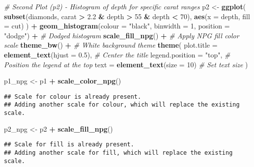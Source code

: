 \documentclass[
  12pt,
]{article}
\newenvironment{Shaded}{\begin{snugshade}}{\end{snugshade}}
\newcommand{\AttributeTok}[1]{\textcolor[rgb]{0.13,0.29,0.53}{#1}}
\newcommand{\CommentTok}[1]{\textcolor[rgb]{0.56,0.35,0.01}{\textit{#1}}}
\newcommand{\DecValTok}[1]{\textcolor[rgb]{0.00,0.00,0.81}{#1}}
\newcommand{\FloatTok}[1]{\textcolor[rgb]{0.00,0.00,0.81}{#1}}
\newcommand{\FunctionTok}[1]{\textcolor[rgb]{0.13,0.29,0.53}{\textbf{#1}}}
\newcommand{\NormalTok}[1]{#1}
\newcommand{\OtherTok}[1]{\textcolor[rgb]{0.56,0.35,0.01}{#1}}
\newcommand{\SpecialCharTok}[1]{\textcolor[rgb]{0.81,0.36,0.00}{\textbf{#1}}}
\newcommand{\StringTok}[1]{\textcolor[rgb]{0.31,0.60,0.02}{#1}}
\begin{document}
\begin{Shaded}
\begin{Highlighting}[]
\CommentTok{\# Second Plot (p2) {-} Histogram of depth for specific carat ranges}
\NormalTok{p2 }\OtherTok{\textless{}{-}} \FunctionTok{ggplot}\NormalTok{(}
  \FunctionTok{subset}\NormalTok{(diamonds, carat }\SpecialCharTok{\textgreater{}} \FloatTok{2.2} \SpecialCharTok{\&}\NormalTok{ depth }\SpecialCharTok{\textgreater{}} \DecValTok{55} \SpecialCharTok{\&}\NormalTok{ depth }\SpecialCharTok{\textless{}} \DecValTok{70}\NormalTok{),}
  \FunctionTok{aes}\NormalTok{(}\AttributeTok{x =}\NormalTok{ depth, }\AttributeTok{fill =}\NormalTok{ cut)}
\NormalTok{) }\SpecialCharTok{+}
  \FunctionTok{geom\_histogram}\NormalTok{(}\AttributeTok{colour =} \StringTok{"black"}\NormalTok{, }\AttributeTok{binwidth =} \DecValTok{1}\NormalTok{, }\AttributeTok{position =} \StringTok{"dodge"}\NormalTok{) }\SpecialCharTok{+}  \CommentTok{\# Dodged histogram}
  \FunctionTok{scale\_fill\_npg}\NormalTok{() }\SpecialCharTok{+}  \CommentTok{\# Apply NPG fill color scale}
  \FunctionTok{theme\_bw}\NormalTok{() }\SpecialCharTok{+}  \CommentTok{\# White background theme}
  \FunctionTok{theme}\NormalTok{(}
    \AttributeTok{plot.title =} \FunctionTok{element\_text}\NormalTok{(}\AttributeTok{hjust =} \FloatTok{0.5}\NormalTok{),  }\CommentTok{\# Center the title}
    \AttributeTok{legend.position =} \StringTok{"top"}\NormalTok{,  }\CommentTok{\# Position the legend at the top}
    \AttributeTok{text =} \FunctionTok{element\_text}\NormalTok{(}\AttributeTok{size =} \DecValTok{10}\NormalTok{)  }\CommentTok{\# Set text size}
\NormalTok{  )}

\NormalTok{p1\_npg }\OtherTok{\textless{}{-}}\NormalTok{ p1 }\SpecialCharTok{+} \FunctionTok{scale\_color\_npg}\NormalTok{()}
\end{Highlighting}
\end{Shaded}

\begin{verbatim}
## Scale for colour is already present.
## Adding another scale for colour, which will replace the existing scale.
\end{verbatim}

\begin{Shaded}
\begin{Highlighting}[]
\NormalTok{p2\_npg }\OtherTok{\textless{}{-}}\NormalTok{ p2 }\SpecialCharTok{+} \FunctionTok{scale\_fill\_npg}\NormalTok{()}
\end{Highlighting}
\end{Shaded}

\begin{verbatim}
## Scale for fill is already present.
## Adding another scale for fill, which will replace the existing scale.
\end{verbatim}
\end{document}
